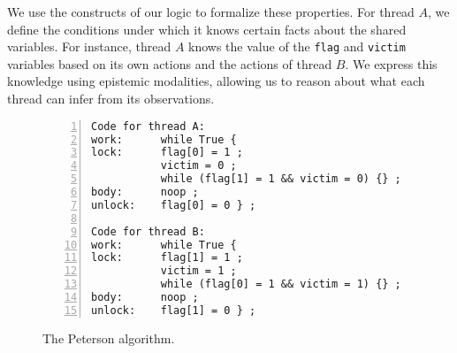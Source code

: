 We use the constructs of our logic to formalize these properties. For thread 
$A$, we define the conditions under which it knows certain facts about the shared variables. For instance, thread  $A$ knows the value of the \texttt{flag} and \texttt{victim} variables based on its own actions and the actions of thread $B$. We express this knowledge using epistemic modalities, allowing us to reason about what each thread can infer from its observations.
%
\begin{figure}[t]
\begin{lstlisting}[xleftmargin=1em, numbers=left, numberstyle=\color{red}]
Code for thread A:
work:      while True {
lock:      flag[0] = 1 ;
           victim = 0 ;
           while (flag[1] = 1 && victim = 0) {} ;
body:      noop ;
unlock:    flag[0] = 0 } ;

Code for thread B:
work:      while True {
lock:      flag[1] = 1 ;
           victim = 1 ;
           while (flag[0] = 1 && victim = 1) {} ;
body:      noop ;
unlock:    flag[1] = 0 } ;
 \end{lstlisting}
 \caption{The Peterson algorithm.}
 \label{PetersonFigOne}
 \end{figure}
%
